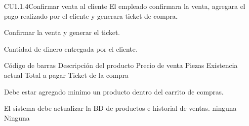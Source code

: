 \begin{UseCase} {CU1.1.4}{Confirmar venta al cliente}{
	El empleado confirmara la venta, agregara el pago realizado por el cliente y generara ticket de compra.
}








	
	{
	}
	{
		Confirmar la venta y generar el ticket.
	}
	{
		
		\UCli Cantidad de dinero entregada por el cliente.
	}
	{
		\UCli Código de barras 
		\UCli Descripción del producto
		\UCli Precio de venta
		\UCli Piezas
		\UCli Existencia actual
		\UCli Total a pagar
		\UCli Ticket de la compra
	}

	{
		\UCli Debe estar agregado minimo un producto dentro del carrito de compras.

	}
	{
		El sistema debe actualizar la BD de productos e historial de ventas.
	}
	{
		ninguna
	}
	{
		Ninguna
	}
\end{UseCase}


